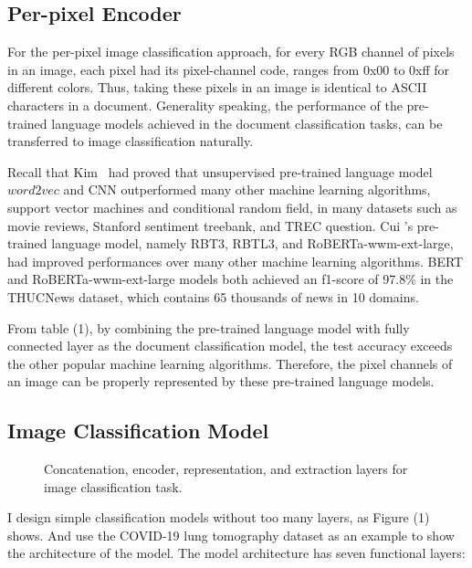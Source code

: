 \documentclass[review]{cvpr}
\begin{document}
\subsection{Per-pixel Encoder}

For the per-pixel image classification approach, for every RGB channel of pixels in an image,
each pixel had its pixel-channel code, ranges from 0x00 to 0xff for different colors.
Thus, taking these pixels in an image is identical to ASCII characters in a document.
Generality speaking, the performance of the pre-trained language models achieved in the document classification tasks, can be transferred to image classification naturally.

\par Recall that Kim~\cite{kim2014convolutional} had proved that unsupervised pre-trained language model $word2vec$ and CNN outperformed many other machine learning algorithms,
\eg support vector machines and conditional random field, in many datasets such as movie reviews, Stanford sentiment treebank, and TREC question.
Cui \etal's pre-trained language model, namely RBT3, RBTL3, and RoBERTa-wwm-ext-large, had improved performances over many other machine learning algorithms.
BERT and RoBERTa-wwm-ext-large models both achieved an f1-score of 97.8\% in the THUCNews dataset, which contains 65 thousands of news in 10 domains.

\par From table (1), by combining the pre-trained language model with fully connected layer as the document classification model,
the test accuracy exceeds the other popular machine learning algorithms.
Therefore, the pixel channels of an image can be properly represented by these pre-trained language models.

\subsection{Image Classification Model}

\begin{figure*}
\begin{center}
\end{center}
   \caption{Concatenation, encoder, representation, and extraction layers for image classification task.}
\label{fig:short}
\end{figure*}

I design simple classification models without too many layers, as Figure (1) shows.
And use the COVID-19 lung tomography dataset as an example to show the architecture of the model.
The model architecture has seven functional layers:
\end{document}
